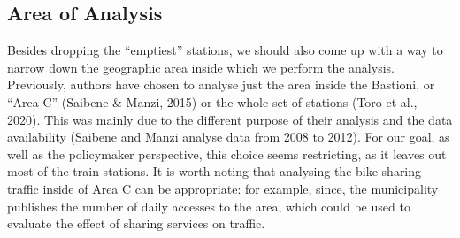 \documentclass[letterpaper,10pt,english]{jupyterBook}
\begin{document}
\subsection{Area of Analysis}
\label{\detokenize{03-data_ingestion_and_spatial_operations:area-of-analysis}}
\sphinxAtStartPar
Besides dropping the “emptiest” stations, we should also come up with a way to narrow down the geographic area inside which we perform the analysis. Previously, authors have chosen to analyse just the area inside the Bastioni, or “Area C” (Saibene \& Manzi, 2015) or the whole set of stations (Toro et al., 2020). This was mainly due to the different purpose of their analysis and the data availability (Saibene and Manzi analyse data from 2008 to 2012). For our goal, as well as the policymaker perspective, this choice seems restricting, as it leaves out most of the train stations. It is worth noting that analysing the bike sharing traffic inside of Area C can be appropriate: for example, since, the municipality publishes the number of daily accesses to the area, which could be used to evaluate the effect of sharing services on traffic.
\end{document}
